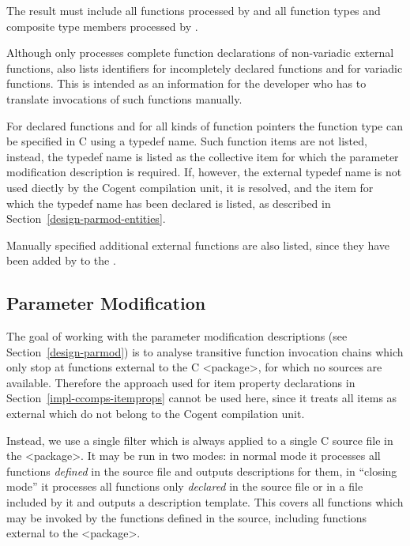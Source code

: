 The result must include all functions processed by  and all function types and composite type members
processed by . 

Although  only processes complete function declarations of non-variadic external functions, 
 also lists identifiers for incompletely declared functions and for variadic functions.
This is intended as an information for the developer who has to translate invocations of such functions manually.

For declared functions and for all kinds of function pointers the function type can be specified in C using a typedef name.
Such function items are not listed, instead, the typedef name is listed as the collective item for which the parameter
modification description is required. If, however, the external typedef name is not used diectly by the Cogent compilation
unit, it is resolved, and the item for which the typedef name has been declared is listed, as described in 
Section~\ref{design-parmod-entities}.

Manually specified additional external functions are also listed, since they have been added by 
to the .

\subsection{Parameter Modification}
\label{impl-ccomps-parmod}

The goal of working with the parameter modification descriptions (see Section~\ref{design-parmod}) is to analyse 
transitive function invocation chains which only stop at functions external to the C <package>, for which no sources
are available. Therefore the approach used for item property declarations in Section~\ref{impl-ccomps-itemprops}
cannot be used here, since it treats all items as external which do not belong to the Cogent compilation unit.

Instead, we use a single filter  which is always applied to a single C source file in the 
<package>. It may be run in two modes: in normal mode it processes all functions \textit{defined} in the source
file and outputs descriptions for them, in ``closing mode'' it processes all functions only \textit{declared} in 
the source file or in a file included by it and outputs a description template. This covers all functions which 
may be invoked by the functions defined in the source, including functions external to the <package>. 


